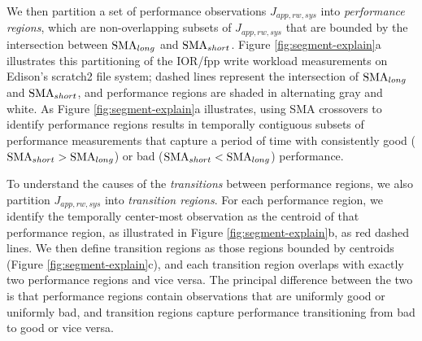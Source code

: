 We then partition a set of performance observations $J_{app, rw, sys}$ into \emph{performance regions}, which are non-overlapping subsets of $J_{app, rw, sys}$ that are bounded by the intersection between $\textup{SMA}_{long}$ and $\textup{SMA}_{short}$.
Figure \ref{fig:segment-explain}a illustrates this partitioning of the IOR/fpp write workload measurements on Edison's scratch2 file system;
dashed lines represent the intersection of $\textup{SMA}_{long}$ and $\textup{SMA}_{short}$, and performance regions are shaded in alternating gray and white.
As Figure \ref{fig:segment-explain}a illustrates, using SMA crossovers to identify performance regions results in temporally contiguous subsets of performance measurements that capture a period of time with consistently good (${\textup{SMA}_{short} > \textup{SMA}_{long}}$) or bad (${\textup{SMA}_{short} < \textup{SMA}_{long}}$) performance.

To understand the causes of the \emph{transitions} between performance regions, we also partition $J_{app, rw, sys}$ into \emph{transition regions}.
For each performance region, we identify the temporally center-most observation as the centroid of that performance region, as illustrated in Figure \ref{fig:segment-explain}b, as red dashed lines.
We then define transition regions as those regions bounded by centroids (Figure \ref{fig:segment-explain}c), and each transition region overlaps with exactly two performance regions and vice versa.
The principal difference between the two is that performance regions contain observations that are uniformly good or uniformly bad, and transition regions capture performance transitioning from bad to good or vice versa.

